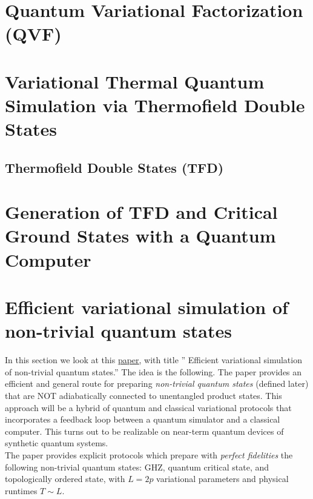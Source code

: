 \documentclass{book}
\theoremstyle{definition}
\begin{document}
\newpage

\section{Quantum Variational Factorization (QVF)}

\newpage



\section{Variational Thermal Quantum Simulation via Thermofield Double States}



\subsection{Thermofield Double States (TFD)}


\newpage



\section{Generation of TFD and Critical Ground States with a Quantum Computer }



\newpage






\section{Efficient variational simulation of non-trivial quantum states}

   
In this section we look at this \href{https://arxiv.org/pdf/1803.00026.pdf}{\underline{paper}}, with title '' Efficient variational simulation of non-trivial quantum states.'' The idea is the following. The paper provides an efficient and general route for preparing \textit{non-trivial quantum states} (defined later) that are NOT adiabatically connected to unentangled product states. This approach will be a hybrid of quantum and classical variational protocols that incorporates a feedback loop between a quantum simulator and a classical computer. This turns out to be realizable on near-term quantum devices of synthetic quantum systems. \\

The paper provides explicit protocols which prepare with \textit{perfect fidelities} the following non-trivial quantum states: GHZ, quantum critical state, and topologically ordered state, with $L=2p$ variational parameters and physical runtimes $T \sim L$. \\
\end{document}
